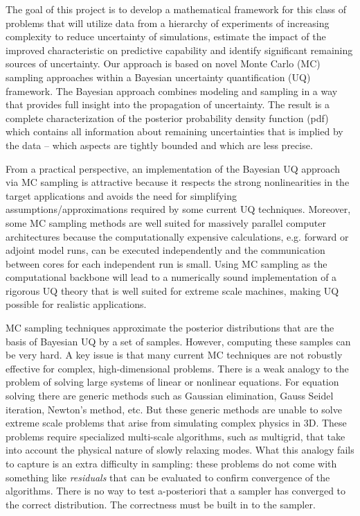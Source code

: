 \documentclass[11pt]{article}
\begin{document}
The goal of this project is to develop a
mathematical framework for this class of problems that
will utilize data from a hierarchy of experiments of increasing complexity to reduce
uncertainty of simulations, estimate the impact of the improved characteristic on predictive capability
and identify significant remaining sources of uncertainty.
Our approach is based on novel Monte Carlo (MC) sampling approaches within a Bayesian uncertainty quantification (UQ) framework. 
The Bayesian approach combines modeling and sampling in a way that provides full insight into the propagation of 
uncertainty.
The result is a complete characterization of the posterior probability density function (pdf) which contains all information about remaining uncertainties that is implied by the data -- which aspects are tightly bounded and which are less precise.

From a practical perspective, an implementation of the Bayesian UQ approach via MC sampling
is attractive because it respects the strong nonlinearities in the target applications
and avoids the need for simplifying assumptions/approximations required by some current UQ techniques.
Moreover, some MC sampling methods are well suited for massively parallel computer
architectures because the computationally expensive calculations,
e.g. forward or adjoint model runs, can be executed independently and
the communication between cores for each independent run is small.
Using MC sampling as the computational backbone will lead to a numerically sound
implementation of a rigorous UQ theory that is well suited for extreme scale machines, making UQ possible for realistic applications.

MC sampling techniques approximate the posterior distributions that are the basis of Bayesian UQ by a set of samples. However, computing these samples can be very hard. A key issue is that many current MC techniques are not robustly effective for complex, high-dimensional problems. There is a weak analogy to the problem of solving large systems of linear or nonlinear equations.
For equation solving there are generic methods such as Gaussian elimination, Gauss Seidel iteration,
Newton's method, etc.
But these generic methods are unable to solve extreme scale problems that arise from simulating
complex physics in 3D.
These problems require specialized multi-scale algorithms, such as multigrid, that take into account the
physical nature of slowly relaxing modes.
What this analogy fails to capture is an extra difficulty in sampling: these problems do not come with 
something like {\em residuals} that can be evaluated to confirm convergence of the algorithms.
There is no way to test a-posteriori that a sampler has converged to the correct distribution.
The correctness must be built in to the sampler.
\end{document}
